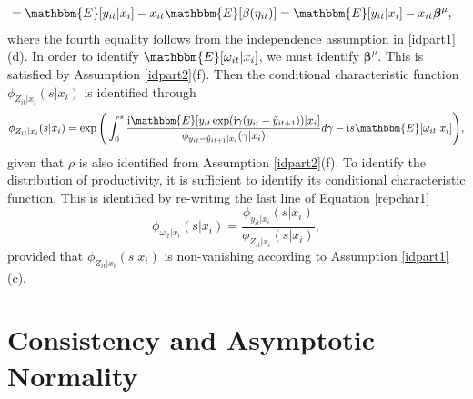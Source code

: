 \documentclass[12pt]{article}
\begin{document}
\begin{appendices}
\begin{equation*}
\begin{split}
&=\mathbbm{E}[y_{it}|x_{i}]-x_{it}\mathbbm{E}[\beta(\eta_{it})]=\mathbbm{E}[y_{it}|x_{i}]-x_{it}\boldsymbol{\beta}^{\mu},
\end{split}
\end{equation*}
where the fourth equality follows from the independence assumption in \eqref{idpart1}(d). In order to identify $\mathbbm{E}[\omega_{it}|x_{i}]$, we must identify $\boldsymbol{\beta}^{\mu}$. This is satisfied by Assumption \ref{idpart2}(f). Then the conditional characteristic function $\phi_{Z_{it}|x_{i}}(s|x_{i})$ is identified through
\begin{equation}\label{charZ1}
\phi_{Z_{it}|x_{i}}(s|x_{i})=\exp\Bigg(\int_{0}^{s}\frac{\mathrm{i}\mathbbm{E}[y_{it}\exp(\mathrm{i}\gamma(y_{it}-\tilde{y}_{it+1}))|x_{i}]}{\phi_{y_{it}-\tilde{y}_{it+1}|x_{i}}(\gamma|x_{i})}d\gamma-\mathrm{i}s\mathbbm{E}[\omega_{it}|x_{i}]\Bigg),
\end{equation}
given that $\rho$ is also identified from Assumption \ref{idpart2}(f). To identify the distribution of productivity, it is sufficient to identify its conditional characteristic function. This is identified by re-writing the last line of Equation \eqref{repchar1}
\begin{equation}\label{charW1}
\phi_{\omega_{it}|x_{i}}(s|x_{i})=\frac{\phi_{y_{it}|x_{i}}(s|x_{i})}{\phi_{Z_{it}|x_{i}}(s|x_{i})},
\end{equation}
provided that $\phi_{Z_{it}|x_{i}}(s|x_{i})$ is non-vanishing according to Assumption \ref{idpart1}(c).

\section{Consistency and Asymptotic Normality} \label{largesample}


\end{appendices}
\end{document}
